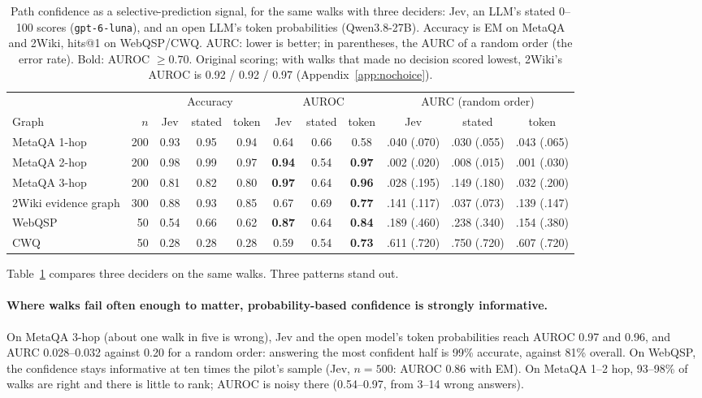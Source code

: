 \documentclass[11pt]{article}
\begin{document}
\begin{table}[t]
\centering\small
\begin{tabular}{lr ccc ccc ccc}
\toprule
& & \multicolumn{3}{c}{Accuracy} & \multicolumn{3}{c}{AUROC} & \multicolumn{3}{c}{AURC (random order)} \\
\cmidrule(lr){3-5}\cmidrule(lr){6-8}\cmidrule(lr){9-11}
Graph & $n$ & Jev & stated & token & Jev & stated & token & Jev & stated & token \\
\midrule
MetaQA 1-hop & 200 & 0.93 & 0.95 & 0.94 & 0.64 & 0.66 & 0.58 & .040 (.070) & .030 (.055) & .043 (.065) \\
MetaQA 2-hop & 200 & 0.98 & 0.99 & 0.97 & \textbf{0.94} & 0.54 & \textbf{0.97} & .002 (.020) & .008 (.015) & .001 (.030) \\
MetaQA 3-hop & 200 & 0.81 & 0.82 & 0.80 & \textbf{0.97} & 0.64 & \textbf{0.96} & .028 (.195) & .149 (.180) & .032 (.200) \\
2Wiki evidence graph & 300 & 0.88 & 0.93 & 0.85 & 0.67 & 0.69 & \textbf{0.77} & .141 (.117) & .037 (.073) & .139 (.147) \\
WebQSP & 50 & 0.54 & 0.66 & 0.62 & \textbf{0.87} & 0.64 & \textbf{0.84} & .189 (.460) & .238 (.340) & .154 (.380) \\
CWQ & 50 & 0.28 & 0.28 & 0.28 & 0.59 & 0.54 & \textbf{0.73} & .611 (.720) & .750 (.720) & .607 (.720) \\
\bottomrule
\end{tabular}
\caption{Path confidence as a selective-prediction signal, for the same walks with three
deciders: Jev, an LLM's stated 0--100 scores (\texttt{gpt-6-luna}), and an open LLM's
token probabilities (Qwen3.8-27B). Accuracy is EM on MetaQA and 2Wiki, hits@1 on
WebQSP/CWQ. AURC: lower is better; in parentheses, the AURC of a random order (the error
rate). Bold: AUROC $\geq 0.70$. Original scoring; with walks that made no decision
scored lowest, 2Wiki's AUROC is 0.92 / 0.92 / 0.97 (Appendix~\ref{app:nochoice}).}
\label{tab:selective}
\end{table}

Table~\ref{tab:selective} compares three deciders on the same walks. Three patterns
stand out.

\paragraph{Where walks fail often enough to matter, probability-based confidence is
strongly informative.} On MetaQA 3-hop (about one walk in five is wrong), Jev and the
open model's token probabilities reach AUROC 0.97 and 0.96, and AURC 0.028--0.032
against 0.20 for a random order: answering the most confident half is 99\% accurate,
against 81\% overall. On WebQSP, the confidence stays informative at ten times the
pilot's sample (Jev, $n=500$: AUROC 0.86 with EM). On MetaQA 1--2 hop, 93--98\% of walks
are right and there is little to rank; AUROC is noisy there (0.54--0.97, from 3--14 wrong
answers).
\end{document}
